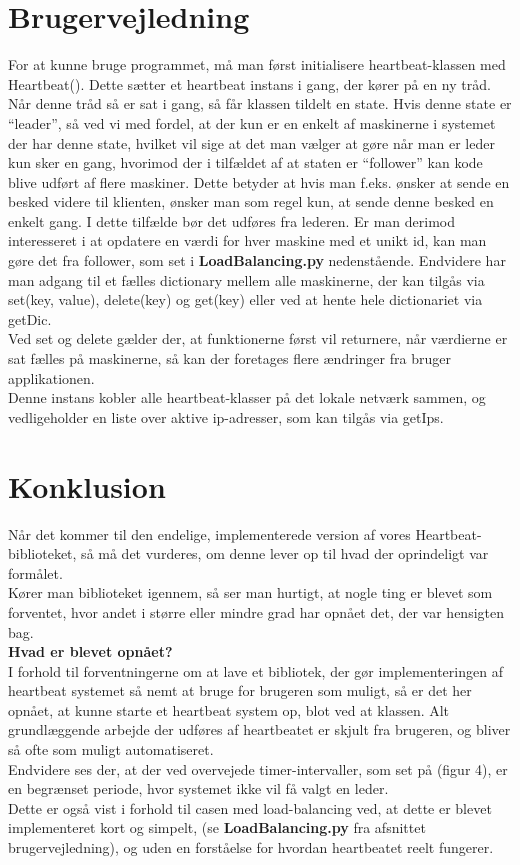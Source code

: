 \documentclass[a4paper,12pt]{article}
\begin{document}
\section{Brugervejledning}
For at kunne bruge programmet, må man først initialisere heartbeat-klassen med Heartbeat(). Dette sætter et heartbeat instans i gang, der kører på en ny tråd.
\\[5px]
Når denne tråd så er sat i gang, så får klassen tildelt en state. Hvis denne state er “leader”, så ved vi med fordel, at der kun er en enkelt af maskinerne i systemet der har denne state, hvilket vil sige at det man vælger at gøre når man er leder kun sker en gang, hvorimod der i tilfældet af at staten er “follower” kan kode blive udført af flere maskiner. Dette betyder at hvis man f.eks. ønsker at sende en besked videre til klienten, ønsker man som regel kun, at sende denne besked en enkelt gang. I dette tilfælde bør det udføres fra lederen. Er man derimod interesseret i at opdatere en værdi for hver maskine med et unikt id, kan man gøre det fra follower, som set i \textbf{LoadBalancing.py} nedenstående.
Endvidere har man adgang til et fælles dictionary mellem alle maskinerne, der kan tilgås via set(key, value), delete(key) og get(key) eller ved at hente hele dictionariet via getDic.
\\
Ved set og delete gælder der, at funktionerne først vil returnere, når værdierne er sat fælles på maskinerne, så kan der foretages flere ændringer fra bruger applikationen.
\\

Denne instans kobler alle heartbeat-klasser på det lokale netværk sammen, og vedligeholder en liste over aktive ip-adresser, som kan tilgås via getIps.
\newpage

\section{Konklusion}
Når det kommer til den endelige, implementerede version af vores Heartbeat-biblioteket, så må det vurderes, om denne lever op til hvad der oprindeligt var formålet.
\\
Kører man biblioteket igennem, så ser man hurtigt, at nogle ting er blevet som forventet, hvor andet i større eller mindre grad har opnået det, der var hensigten bag.
\\[5px]
\textbf{Hvad er blevet opnået?}
\\
I forhold til forventningerne om at lave et bibliotek, der gør implementeringen af heartbeat systemet så nemt at bruge for brugeren som muligt, så er det her opnået, at kunne starte et heartbeat system op, blot ved at  klassen.
Alt grundlæggende arbejde der udføres af heartbeatet er skjult fra brugeren, og bliver så ofte som muligt automatiseret.
\\
Endvidere ses der, at der ved overvejede timer-intervaller, som set på (figur 4), er en begrænset periode, hvor systemet ikke vil få valgt en leder.
\\
Dette er også vist i forhold til casen med load-balancing ved, at dette er blevet implementeret kort og simpelt, (se \textbf{LoadBalancing.py} fra afsnittet brugervejledning), og uden en forståelse for hvordan heartbeatet reelt fungerer.
\newpage
\end{document}
